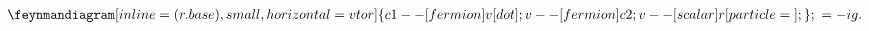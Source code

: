 \documentclass[preview]{standalone}
\begin{document}
\abovedisplayskip=0pt
\begin{align*}
    \feynmandiagram [inline=(r.base), small, horizontal=v to r] {
        c1 --[fermion] v [dot];
        v --[fermion] c2;
        v --[scalar] r[particle=\vphantom{Mg}];
    }; \ = -ig.
\end{align*}
\end{document}
